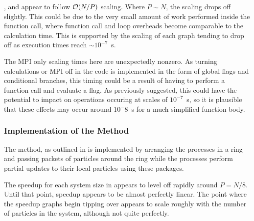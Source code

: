 %
,
 and
appear to follow $\mathcal{O}{\left({ N/P }\right)}$ scaling.
%
Where $P \sim{} N$, the scaling drops off slightly.
%
This could be due to the very small amount of work performed
inside the function call, where function call and loop overheads
become comparable to the calculation time.
%
This is supported by the scaling of each graph tending to drop off
as execution times reach $\sim{} 10^{-7}$~s.

The MPI only scaling times here are unexpectedly nonzero.
%
As turning calculations or MPI off in the code is implemented in
the form of global flags and conditional branches, this timing
could be a result of having to perform a function call and
evaluate a flag.
%
As previously suggested, this could have the potential to impact on
operations occuring at scales of $10^{-7}$~s, so it is plausible
that these effects may occur around $10^-{8}$~s for a much simplified
function body.


%
%

\subsubsection{Implementation of the \pairoperation{} Method}

The \pairoperation{} method, as outlined in 
is implemented by arranging the processes in a ring and passing
packets of particles around the ring while the processes perform
partial updates to their local particles using these packages.


%

%
%
\begin{figure}[!h]
    
    \caption{
        \vZeroSpeedupCaption
            {\systolicloop{}}
            {\pairoperation{}}
    }
    \label{fig:v0_systolic_pair_operation_speedups}
\end{figure}


\vZeroSpeedupExplanation
    {}
    {\systolicloop{}}
    {\pairoperation{}}

The speedup for each system size in 
appears to level off rapidly around $P = N/8$.
%
Until that point, speedup appears to be almost perfectly linear.
%
The point where the speedup graphs begin tipping over appears to
scale roughly with the number of particles in the system,
although not quite perfectly.


